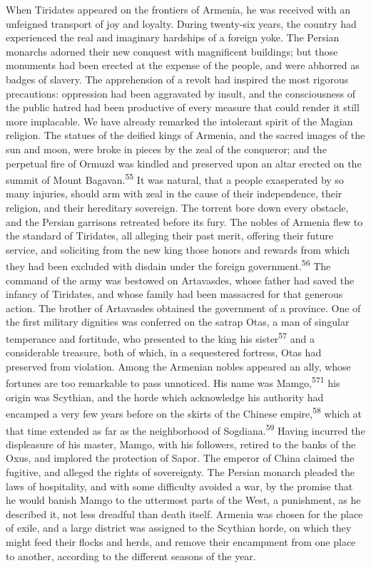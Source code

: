 
When Tiridates appeared on the frontiers of Armenia, he was
received with an unfeigned transport of joy and loyalty. During
twenty-six years, the country had experienced the real and
imaginary hardships of a foreign yoke. The Persian monarchs
adorned their new conquest with magnificent buildings; but those
monuments had been erected at the expense of the people, and were
abhorred as badges of slavery. The apprehension of a revolt had
inspired the most rigorous precautions: oppression had been
aggravated by insult, and the consciousness of the public hatred
had been productive of every measure that could render it still
more implacable. We have already remarked the intolerant spirit
of the Magian religion. The statues of the deified kings of
Armenia, and the sacred images of the sun and moon, were broke in
pieces by the zeal of the conqueror; and the perpetual fire of
Ormuzd was kindled and preserved upon an altar erected on the
summit of Mount Bagavan.\textsuperscript{55} It was natural, that a people
exasperated by so many injuries, should arm with zeal in the
cause of their independence, their religion, and their hereditary
sovereign. The torrent bore down every obstacle, and the Persian
garrisons retreated before its fury. The nobles of Armenia flew
to the standard of Tiridates, all alleging their past merit,
offering their future service, and soliciting from the new king
those honors and rewards from which they had been excluded with
disdain under the foreign government.\textsuperscript{56} The command of the army
was bestowed on Artavasdes, whose father had saved the infancy of
Tiridates, and whose family had been massacred for that generous
action. The brother of Artavasdes obtained the government of a
province. One of the first military dignities was conferred on
the satrap Otas, a man of singular temperance and fortitude, who
presented to the king his sister\textsuperscript{57} and a considerable treasure,
both of which, in a sequestered fortress, Otas had preserved from
violation. Among the Armenian nobles appeared an ally, whose
fortunes are too remarkable to pass unnoticed. His name was
Mamgo,\textsuperscript{571} his origin was Scythian, and the horde which
acknowledge his authority had encamped a very few years before on
the skirts of the Chinese empire,\textsuperscript{58} which at that time extended
as far as the neighborhood of Sogdiana.\textsuperscript{59} Having incurred the
displeasure of his master, Mamgo, with his followers, retired to
the banks of the Oxus, and implored the protection of Sapor. The
emperor of China claimed the fugitive, and alleged the rights of
sovereignty. The Persian monarch pleaded the laws of hospitality,
and with some difficulty avoided a war, by the promise that he
would banish Mamgo to the uttermost parts of the West, a
punishment, as he described it, not less dreadful than death
itself. Armenia was chosen for the place of exile, and a large
district was assigned to the Scythian horde, on which they might
feed their flocks and herds, and remove their encampment from one
place to another, according to the different seasons of the year.

